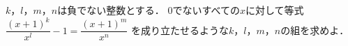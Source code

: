 \documentclass[../../main.tex]{subfiles}
\begin{document}
$k$，$l$，$m$，$n$は負でない整数とする．
0でないすべての$x$に対して等式
$\displaystyle\dfrac{(x+1)^k}{x^l}-1=\dfrac{(x+1)^m}{x^n}$
を成り立たせるような$k$，$l$，$m$，$n$の組を求めよ．
\end{document}
